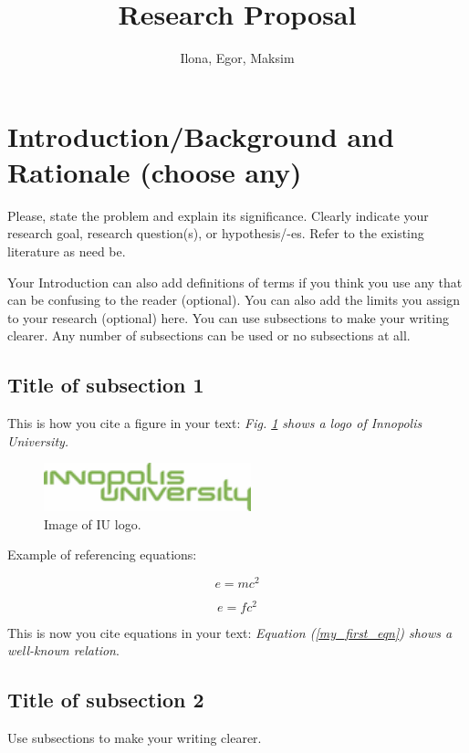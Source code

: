 \documentclass[oneside,final,12pt,a4paper]{extreport}
\title{Research Proposal}
\author{Ilona, Egor, Maksim}
\affil{Innopolis University}
\begin{document}
\maketitle

\newpage

\section{Introduction/Background and Rationale (choose any)}
Please, state the problem and explain its significance. Clearly indicate your research goal, research question(s), or hypothesis/-es. Refer to the existing literature as need be. 

Your Introduction can also add definitions of terms if you think you use any that can be confusing to the reader (optional). You can also add the limits you assign to your research (optional) here. You can use subsections to make your writing clearer. Any number of subsections can be used or no subsections at all.
\subsection{Title of subsection 1}

This is how you cite a figure in your text: \textit{Fig. \ref{fig:inno} shows a logo of Innopolis University.}

\begin{figure}[htp]
    \centering
    \includegraphics[width=6cm]{figs/inno.png}
    \caption{Image of IU logo.}
    \label{fig:inno}
\end{figure}Example of referencing equations: 



\begin{equation}\label{my_first_eqn}
e=mc^2
\end{equation}

\begin{equation}\label{my_second_eqn}
e=fc^2
\end{equation}

This is now you cite equations in your text: \textit{Equation (\ref{my_first_eqn}) shows a well-known relation}.
\subsection{Title of subsection 2}
Use subsections to make your writing clearer.
\end{document}
